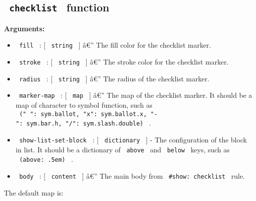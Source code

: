 
\subsection{\texorpdfstring{\texttt{\ checklist\ }
function}{ checklist  function}}\label{checklist-function}

\begin{Shaded}
\begin{Highlighting}[]
\end{Highlighting}
\end{Shaded}

\textbf{Arguments:}

\begin{itemize}
\tightlist
\item
  \texttt{\ fill\ } : {[} \texttt{\ string\ } {]} â€'' The fill color
  for the checklist marker.
\item
  \texttt{\ stroke\ } : {[} \texttt{\ string\ } {]} â€'' The stroke
  color for the checklist marker.
\item
  \texttt{\ radius\ } : {[} \texttt{\ string\ } {]} â€'' The radius of
  the checklist marker.
\item
  \texttt{\ marker-map\ } : {[} \texttt{\ map\ } {]} â€'' The map of the
  checklist marker. It should be a map of character to symbol function,
  such as
  \texttt{\ ("\ ":\ sym.ballot,\ "x":\ sym.ballot.x,\ "-":\ sym.bar.h,\ "/":\ sym.slash.double)\ }
  .
\item
  \texttt{\ show-list-set-block\ } : {[} \texttt{\ dictionary\ } {]} -
  The configuration of the block in list. It should be a dictionary of
  \texttt{\ above\ } and \texttt{\ below\ } keys, such as
  \texttt{\ (above:\ .5em)\ } .
\item
  \texttt{\ body\ } : {[} \texttt{\ content\ } {]} â€'' The main body
  from \texttt{\ \#show:\ checklist\ } rule.
\end{itemize}

The default map is:

